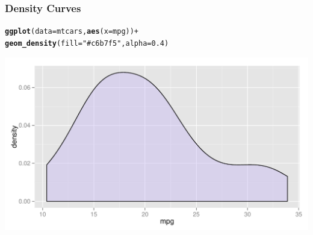 \documentclass[12pt]{beamer}\usepackage[]{graphicx}\usepackage[]{color}
\makeatletter
\newcommand{\hlnum}[1]{\textcolor[rgb]{0.686,0.059,0.569}{#1}}%
\newcommand{\hlstr}[1]{\textcolor[rgb]{0.192,0.494,0.8}{#1}}%
\newcommand{\hlopt}[1]{\textcolor[rgb]{0,0,0}{#1}}%
\newcommand{\hlstd}[1]{\textcolor[rgb]{0.345,0.345,0.345}{#1}}%
\newcommand{\hlkwc}[1]{\textcolor[rgb]{0.333,0.667,0.333}{#1}}%
\newcommand{\hlkwd}[1]{\textcolor[rgb]{0.737,0.353,0.396}{\textbf{#1}}}%
\newenvironment{kframe}{%
 \def\at@end@of@kframe{}%
 \ifinner\ifhmode%
  \def\at@end@of@kframe{\end{minipage}}%
  \begin{minipage}{\columnwidth}%
 \fi\fi%
 \def\FrameCommand##1{\hskip\@totalleftmargin \hskip-\fboxsep
 \colorbox{shadecolor}{##1}\hskip-\fboxsep
     \hskip-\linewidth \hskip-\@totalleftmargin \hskip\columnwidth}%
 \MakeFramed {\advance\hsize-\width
   \@totalleftmargin\z@ \linewidth\hsize
   \@setminipage}}%
 {\par\unskip\endMakeFramed%
 \at@end@of@kframe}
\newenvironment{knitrout}{}{} %
\makeatother
\begin{document}
\begin{frame}[fragile]
\frametitle{Density Curves}

\begin{knitrout}\scriptsize
{}\color{fgcolor}\begin{kframe}
\begin{alltt}
\hlkwd{ggplot}\hlstd{(}\hlkwc{data} \hlstd{= mtcars,} \hlkwd{aes}\hlstd{(}\hlkwc{x} \hlstd{= mpg))} \hlopt{+}
  \hlkwd{geom_density}\hlstd{(}\hlkwc{fill} \hlstd{=} \hlstr{"#c6b7f5"}\hlstd{,} \hlkwc{alpha} \hlstd{=} \hlnum{0.4}\hlstd{)}
\end{alltt}
\end{kframe}

{\centering \includegraphics[width=.9\linewidth,height=.5\linewidth]{figure/unnamed-chunk-10-1} 

}



\end{knitrout}

\end{frame}

\end{document}
